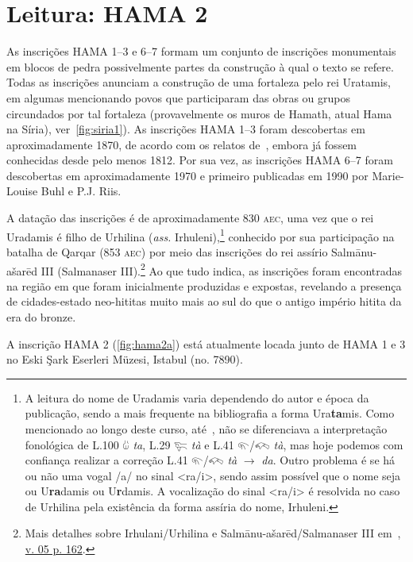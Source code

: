 \section{Leitura: HAMA 2}

As inscrições HAMA 1--3 e 6--7 formam um conjunto de inscrições monumentais
em blocos de pedra possivelmente partes da construção à qual o texto se refere.
Todas as inscrições anunciam a construção de uma fortaleza pelo rei Uratamis, em
algumas mencionando povos que participaram das obras ou grupos circundados por
tal fortaleza (provavelmente os muros de Hamath, atual Hama na Síria),
ver~\autoref{fig:siria1}).
As inscrições HAMA 1--3 foram descobertas em aproximadamente 1870, de acordo com
os relatos de~\citet[pp. 333ff.]{UnexploredSyriaI}, embora já fossem conhecidas
desde pelo menos 1812.
Por sua vez, as inscrições HAMA 6--7 foram descobertas em aproximadamente 1970 e
primeiro publicadas em 1990 por Marie-Louise Buhl e P.J. Riis.

A datação das inscrições é de aproximadamente 830 \textsc{aec}, uma vez que
o rei
Uradamis é filho de Urhilina (\emph{ass.} Irhuleni),\footnote{
	A leitura do nome de Uradamis varia dependendo do autor e
	época da publicação, sendo a mais frequente na bibliografia a forma
	Ura\textbf{ta}mis.
	Como mencionado ao longo deste curso, até~\citet{Rieken2008}, não se
	diferenciava a interpretação fonológica de
	L.100 𔑰 \emph{ta}, L.29 𔐞 \emph{tà} e L.41 𔐬\slash{}𔐫 \emph{tà}, mas hoje
	podemos com confiança realizar a correção L.41 𔐬\slash{}𔐫 \emph{tà}
	$\rightarrow$ \emph{da}. Outro problema é se há ou não uma vogal /a/ no sinal
	<ra\slash{}i>, sendo assim possível que o nome seja ou U\textbf{ra}damis ou
	U\textbf{r}damis.
	A vocalização do sinal <ra\slash{}i> é resolvida no caso de Urhilina pela
	existência da forma assíria do nome, Irhuleni.
} conhecido por sua
participação na batalha de Qarqar (853 \textsc{aec}) por meio das inscrições
do rei assírio Salmānu-ašarēd III (Salmanaser III).\footnote{Mais detalhes
	sobre Irhulani\slash{}Urhilina e Salmānu-ašarēd\slash{}Salmanaser III
	em~,
	\href{https://publikationen.badw.de/en/rla/index\#5833}{v. 05 p. 162}.
}
Ao que tudo indica, as inscrições foram encontradas na região em que foram
inicialmente produzidas e expostas, revelando a presença de cidades-estado
neo-hititas muito mais ao sul do que o antigo império hitita da era do bronze.

A inscrição HAMA 2 (\autoref{fig:hama2a}) está atualmente locada junto de HAMA
1 e 3 no Eski Şark Eserleri Müzesi, Istabul (no. 7890).


